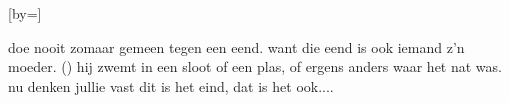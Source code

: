  

[by=]




\beginverse
doe nooit zomaar gemeen tegen een eend.
want die eend is ook iemand z'n moeder.  ()
hij zwemt in een sloot of een plas,
of ergens anders waar het nat was.
nu denken jullie vast dit is het eind,
dat is het ook....
\endverse





\endsong
